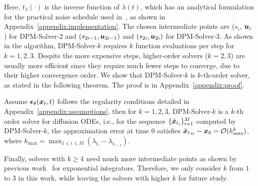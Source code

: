 Here, $t_\lambda(\cdot)$ is the inverse function of $\lambda(t)$, which has an analytical formulation for the practical noise schedule used in~\citep{ho2020denoising,nichol2021improved}, as shown in Appendix~\ref{appendix:implementation}. The chosen intermediate points are ($s_i$, $\bm{u}_{i}$) for DPM-Solver-2 and $(s_{2i-1}, \bm{u}_{2i-1})$ and $(s_{2i}, \bm{u}_{2i})$ for DPM-Solver-3. 
As shown in the algorithm, DPM-Solver-$k$ requires $k$ function evaluations per step for $k=1, 2, 3$. Despite the more expensive steps, higher-order solvers ($k=2, 3$) are usually more efficient since they require much fewer steps to converge, due to their higher convergence order. 
We show that DPM-Solver-$k$ is $k$-th-order solver, as stated in the following theorem. The proof is in Appendix~\ref{appendix:proof}.



\begin{theorem}
\label{thrm:order}
Assume $\bm{\epsilon}_\theta(\bm{x}_t,t)$ follows the regularity conditions detailed in Appendix~\ref{appendix:assumptions}, then for $k=1,2,3$, DPM-Solver-$k$ is a $k$-th order solver for diffusion ODEs, i.e., for the sequence $\{\tilde{\bm{x}}_{t_i}\}_{i=1}^M$ computed by DPM-Solver-$k$, the approximation error at time $0$ satisfies $\tilde {\bm{x}}_{t_M} - \bm{x}_0 =\mathcal O(h_{\max}^k)$, where $h_{\text{max}}=\max_{1\leq i \leq M}(\lambda_{t_i}-\lambda_{t_{i-1}})$.
\end{theorem}

Finally, solvers with $k\geq 4$ need much more intermediate points as shown by previous work~\citep{hochbruck2005explicit,luan2021efficient} for  exponential integrators. Therefore, we only consider $k$ from $1$ to $3$ in this work, while leaving the solvers with higher $k$ for future study.






























